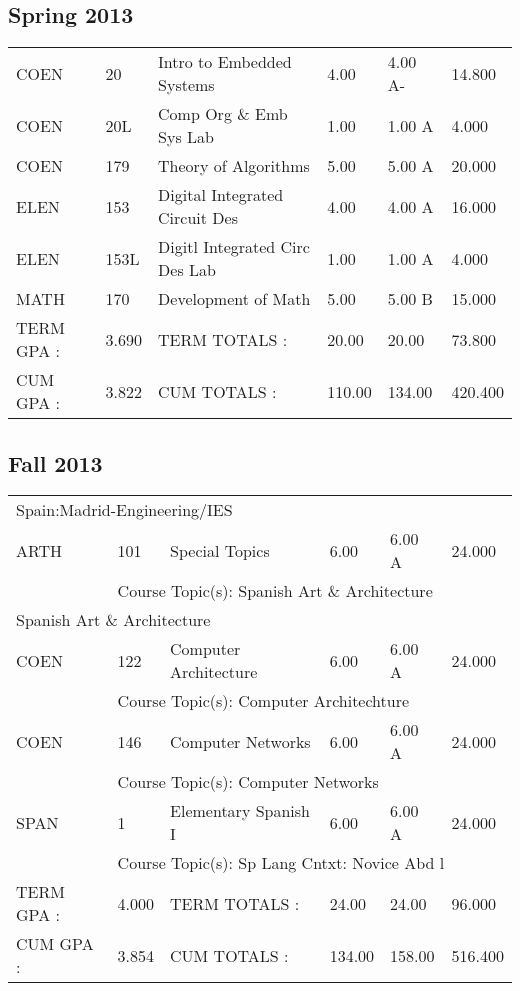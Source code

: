 \documentclass{article}\usepackage[T1]{fontenc}
\begin{document}
\subsection{Spring 2013}
\begin{tabular}{ l  l  l  l  l  l }
COEN&20&Intro to Embedded Systems&4.00&4.00 A-&14.800\\
COEN&20L&Comp Org \& Emb Sys Lab&1.00&1.00 A&4.000\\
COEN&179&Theory of Algorithms&5.00&5.00 A&20.000\\
ELEN&153&Digital Integrated Circuit Des&4.00&4.00 A&16.000\\
ELEN&153L&Digitl Integrated Circ Des Lab&1.00&1.00 A&4.000\\
MATH&170&Development of Math&5.00&5.00 B&15.000\\
\hline
TERM GPA :&3.690&TERM TOTALS :&20.00&20.00&73.800\\
CUM GPA :&3.822&CUM TOTALS :&110.00&134.00&420.400\\\end{tabular}
\subsection{Fall 2013}
\begin{tabular}{ l  l  l  l  l  l }
\multicolumn{6}{l}{Spain:Madrid-Engineering/IES}
\\
ARTH&101&Special Topics&6.00&6.00 A&24.000\\
&
\multicolumn{5}{l}{Course Topic(s): Spanish Art \& Architecture}
\\
\multicolumn{6}{l}{Spanish Art \& Architecture}
\\
COEN&122&Computer Architecture&6.00&6.00 A&24.000\\
&
\multicolumn{5}{l}{Course Topic(s): Computer Architechture}
\\
COEN&146&Computer Networks&6.00&6.00 A&24.000\\
&
\multicolumn{5}{l}{Course Topic(s): Computer Networks}
\\
SPAN&1&Elementary Spanish I&6.00&6.00 A&24.000\\
&
\multicolumn{5}{l}{Course Topic(s): Sp Lang Cntxt: Novice Abd l}
\\
\hline
TERM GPA :&4.000&TERM TOTALS :&24.00&24.00&96.000\\
CUM GPA :&3.854&CUM TOTALS :&134.00&158.00&516.400\\\end{tabular}
\end{document}
